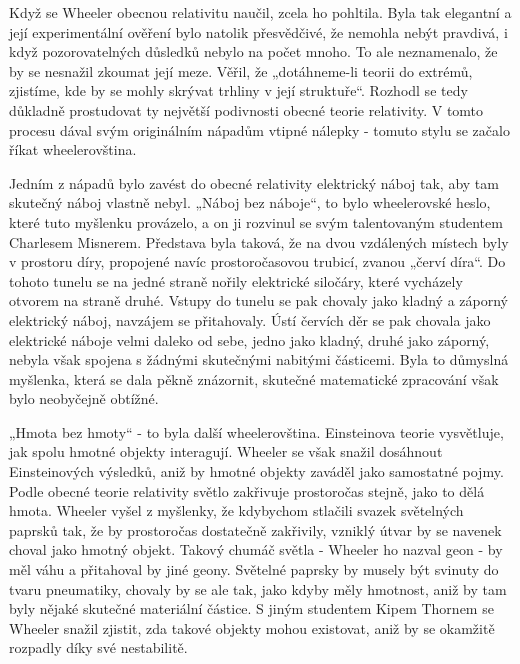   Když se Wheeler obecnou relativitu naučil, zcela ho pohltila. Byla tak elegantní a její
  experimentální ověření bylo natolik přesvědčivé, že nemohla nebýt pravdivá, i když pozorovatelných
  důsledků nebylo na počet mnoho. To ale neznamenalo, že by se nesnažil zkoumat její meze. Věřil, že
  „dotáhneme-li teorii do extrémů, zjistíme, kde by se mohly skrývat trhliny v její struktuře“.
  Rozhodl se tedy důkladně prostudovat ty největší podivnosti obecné teorie relativity. V tomto
  procesu dával svým originálním nápadům vtipné nálepky - tomuto stylu se začalo říkat
  wheelerovština.

  Jedním z nápadů bylo zavést do obecné relativity elektrický náboj tak, aby tam skutečný náboj
  vlastně nebyl. „Náboj bez náboje“, to bylo wheelerovské heslo, které tuto myšlenku provázelo, a on
  ji rozvinul se svým talentovaným studentem Charlesem Misnerem. Představa byla taková, že na dvou
  vzdálených místech byly v prostoru díry, propojené navíc prostoročasovou trubicí, zvanou „červí
  díra“. Do tohoto tunelu se na jedné straně nořily elektrické siločáry, které vycházely otvorem na
  straně druhé. Vstupy do tunelu se pak chovaly jako kladný a záporný elektrický náboj, navzájem se
  přitahovaly. Ústí červích děr se pak chovala jako elektrické náboje velmi daleko od sebe, jedno
  jako kladný, druhé jako záporný, nebyla však spojena s žádnými skutečnými nabitými částicemi. Byla
  to důmyslná myšlenka, která se dala pěkně znázornit, skutečné matematické zpracování však bylo
  neobyčejně obtížné. 

  „Hmota bez hmoty“ - to byla další wheelerovština. Einsteinova teorie vysvětluje, jak spolu hmotné
  objekty interagují. Wheeler se však snažil dosáhnout Einsteinových výsledků, aniž by hmotné
  objekty zaváděl jako samostatné pojmy. Podle obecné teorie relativity světlo zakřivuje prostoročas
  stejně, jako to dělá hmota. Wheeler vyšel z myšlenky, že kdybychom stlačili svazek světelných
  paprsků tak, že by prostoročas dostatečně zakřivily, vzniklý útvar by se navenek choval jako
  hmotný objekt. Takový chumáč světla - Wheeler ho nazval geon - by měl váhu a přitahoval by jiné
  geony. Světelné paprsky by musely být svinuty do tvaru pneumatiky, chovaly by se ale tak, jako
  kdyby měly hmotnost, aniž by tam byly nějaké skutečné materiální částice. S jiným studentem Kipem
  Thornem se Wheeler snažil zjistit, zda takové objekty mohou existovat, aniž by se okamžitě
  rozpadly díky své nestabilitě. 


